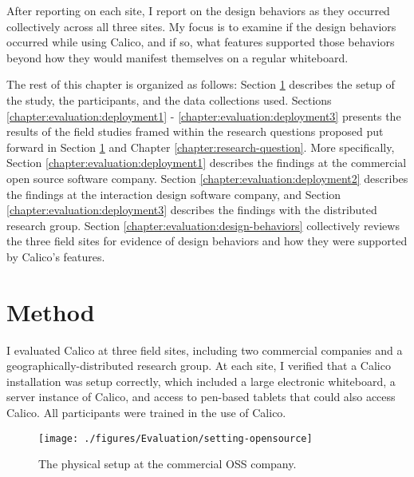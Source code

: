 \documentclass[12pt,fleqn]{ucithesis}
\begin{document}
After reporting on each site, I report on the design behaviors as they occurred collectively across all three sites. My focus is to examine if the design behaviors occurred  while using Calico, and if so, what features supported those behaviors beyond how they would manifest themselves on a regular whiteboard.

The rest of this chapter is organized as follows: Section \ref{chapter:evaluation:overview} describes the setup of the study, the participants, and the data collections used. Sections \ref{chapter:evaluation:deployment1} - \ref{chapter:evaluation:deployment3} presents the results of the field studies framed within the research questions proposed put forward in Section \ref{chapter:evaluation:overview} and Chapter \ref{chapter:research-question}. More specifically, Section \ref{chapter:evaluation:deployment1} describes the findings at the commercial open source software company. Section \ref{chapter:evaluation:deployment2} describes the findings at the interaction design software company, and Section \ref{chapter:evaluation:deployment3} describes the findings with the distributed research group. Section \ref{chapter:evaluation:design-behaviors} collectively reviews the three field sites for evidence of design behaviors and how they were supported by Calico's features. 

\section{Method}
\label{chapter:evaluation:overview}

I evaluated Calico at three field sites, including two commercial companies and a geographically-distributed research group. At each site, I verified that a Calico installation was setup correctly, which included a large electronic whiteboard, a server instance of Calico, and access to pen-based tablets that could also access Calico. All participants were trained in the use of Calico.

\begin{figure*}[tbh]
  \centering
  \texttt{[image: ./figures/Evaluation/setting-opensource]}
  \caption{The physical setup at the commercial OSS company.}
  \label{fig:evaluation:setting-opensource}
\end{figure*}
\end{document}
